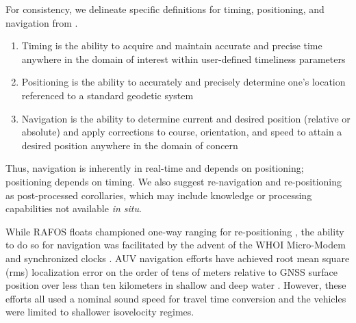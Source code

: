\documentclass[preprint,TurnOnLineNumbers]{JASA}
\newcommand{\llabel}[1]{\hypertarget{llineno:#1}{\linelabel{#1}}}
\begin{document}

For consistency, we delineate specific definitions for timing, positioning, and navigation from \citet{Howe2019}.
\begin{enumerate}
    \item Timing is the ability to acquire and maintain accurate and precise time anywhere in the domain of interest within user-defined timeliness parameters
    \item Positioning is the ability to accurately and precisely determine one's location referenced to a standard geodetic system
    \item Navigation is the ability to determine current and desired position (relative or absolute) and apply corrections to course, orientation, and speed to attain a desired position anywhere in the domain of concern
\end{enumerate}
Thus, navigation is inherently in real-time and depends on positioning; positioning depends on timing.
We also suggest re-navigation and re-positioning as post-processed corollaries, which may include knowledge or processing capabilities not available \textit{in situ}.

While RAFOS floats championed one-way ranging for re-positioning \citep{Rossby1986,duda_evaluation_2006}, the ability to do so for navigation was facilitated by \llabel{1.11} the advent of the WHOI Micro-Modem \citep{Singh2006} and synchronized clocks \citep{rypkema_one-way_2017}.
\llabel{1.3a}
AUV navigation efforts have achieved root mean square (rms) localization error on the order of tens of meters relative to GNSS surface position over less than ten kilometers in shallow \citep{Eustice2007,Claus2018,kepper_mems_2017} and deep water \citep{Kunz2008,jakuba_long-baseline_2008,Webster2009}.
However, these efforts all used a nominal sound speed for travel time conversion and the vehicles were limited to shallower isovelocity regimes.
\end{document}
